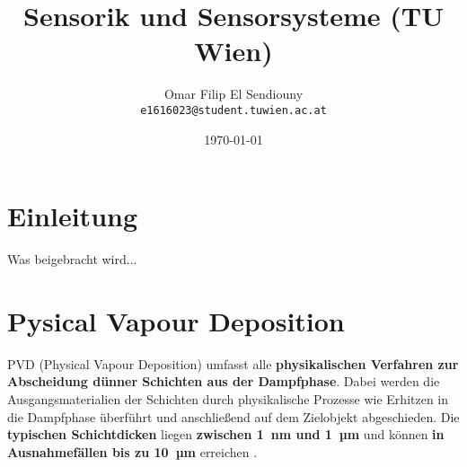 \documentclass{article} %
\title{Sensorik und Sensorsysteme (TU Wien)}
\author{Omar Filip El Sendiouny \\ \texttt{e1616023@student.tuwien.ac.at}}
\date{\today}
\begin{document}
\maketitle
\thispagestyle{empty} %
\newpage  

\tableofcontents
\listoffigures
\thispagestyle{empty}
\newpage


\section*{Einleitung} %
Was beigebracht wird...

\vspace{1em}
\section{Pysical Vapour Deposition} %
PVD (Physical Vapour Deposition) umfasst alle \textbf{physikalischen Verfahren zur Abscheidung dünner Schichten aus der Dampfphase}.
Dabei werden die Ausgangsmaterialien der Schichten durch physikalische Prozesse wie Erhitzen in die Dampfphase überführt und anschließend 
auf dem Zielobjekt abgeschieden. Die \textbf{typischen Schichtdicken} liegen \textbf{zwischen 1~nm und 1~µm} und können 
\textbf{in Ausnahmefällen bis zu 10~µm} erreichen \cite{keplinger2024}.

\vspace{1em}
\end{document}
